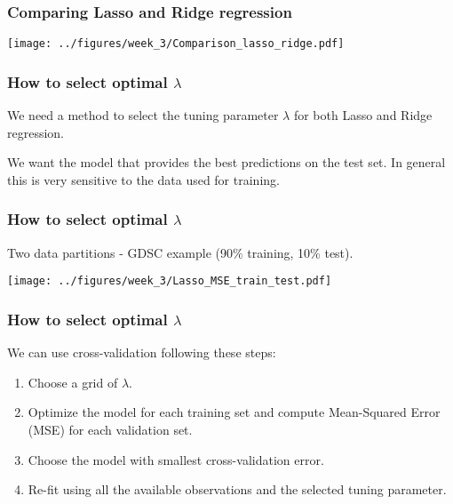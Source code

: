 \documentclass[notes]{beamer}          %
\begin{document}
\begin{frame}
\frametitle{Comparing Lasso and Ridge regression}

\begin{center}
\texttt{[image: ../figures/week\_3/Comparison\_lasso\_ridge.pdf]}
\end{center}

\end{frame}


\begin{frame}
\frametitle{How to select optimal $\lambda$}

We need a method to select the tuning parameter $\lambda$ for both Lasso and Ridge regression.

\vspace{5mm} 

We want the model that provides the best predictions on the test set. In general this is very sensitive to the data used for training.
\end{frame}


\begin{frame}
\frametitle{How to select optimal $\lambda$}

Two data partitions - GDSC example (90\% training, 10\% test).

\begin{center}
\texttt{[image: ../figures/week\_3/Lasso\_MSE\_train\_test.pdf]}
\end{center}
\end{frame}

\begin{frame}
\frametitle{How to select optimal $\lambda$}

We can use cross-validation following these steps:
\begin{enumerate}
  \item Choose a grid of $\lambda$.
  \item Optimize the model for each training set and compute Mean-Squared Error (MSE) for each validation set.
  \item Choose the model with smallest cross-validation error.
  \item Re-fit using all the available observations and the selected tuning parameter.
\end{enumerate}

\end{frame}
\end{document}
